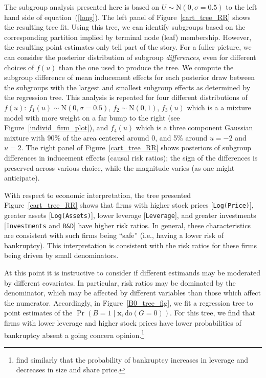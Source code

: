 \documentclass[aoas,preprint, 11pt, dvipsnames, table, x11name]{imsart}
\newcommand{\N}{\mbox{N}}
\renewcommand{\bm}[1]{\mathbf{#1}}
\theoremstyle{remark}
\begin{document}
	
	The subgroup analysis presented here is based on $U \sim \N(0, \sigma=0.5)$ to the left hand side of equation~(\ref{long}). The left panel of Figure~\ref{cart_tree_RR} shows the resulting tree fit. Using this tree, we can identify subgroups based on the corresponding partition implied by terminal node (leaf) membership. However, the resulting point estimates only tell part of the story. For a fuller picture, we can consider the posterior distribution of subgroup {\em differences}, even for different choices of $f(u)$ than the one used to produce the tree.  We compute the subgroup difference of mean inducement effects for each posterior draw between the subgroups with the largest and smallest subgroup effects as determined by the regression tree.  This analysis is repeated for four different distributions of $f(u)$: $f_1(u)\sim \N(0,\sigma=0.5)$, $f_2\sim \N(0,1)$, $f_3(u)$ which is a a mixture model with more weight on a far bump to the right (see Figure~\ref{individ_firm_plot}), and $f_4(u)$ which is a three component Gaussian mixture with 90\% of the area centered around 0, and 5\% around $u=-2$ and $u=2$. The right panel of Figure~\ref{cart_tree_RR} shows posteriors of subgroup differences in inducement effects (causal risk ratios); the sign of the differences is preserved across various choice, while the magnitude varies (as one might anticipate).
	
	With respect to economic interpretation, the tree presented Figure~\ref{cart_tree_RR} shows that firms with higher stock prices [{\tt Log(Price)}], greater assets [{\tt Log(Assets)}], lower leverage [{\tt Leverage}], and greater investments [{\tt Investments} and {\tt R\&D}] have higher risk ratios. In general, these characteristics are consistent with such firms being ``safe'' (i.e., having a lower risk of bankruptcy). This interpretation is consistent with the risk ratios for these firms being driven by small denominators.
	
	At this point it is instructive to consider if different estimands may be moderated by different covariates. In particular, risk ratios may be dominated by the denominator, which may be affected by different variables than those which affect the numerator. Accordingly, in Figure~\ref{B0_tree_fig}, we fit a regression tree to point estimates of the $\Pr(B=1\mid \bm{x}, \text{do}(G=0))$. For this tree, we find that firms with lower leverage and higher stock prices have lower probabilities of bankruptcy absent a going concern opinion.\footnote{\cite{Campbell-Hilscher-Szilagyi-2008} find similarly that the probability of bankruptcy increases in leverage and decreases in size and share price.}
	
\end{document}
